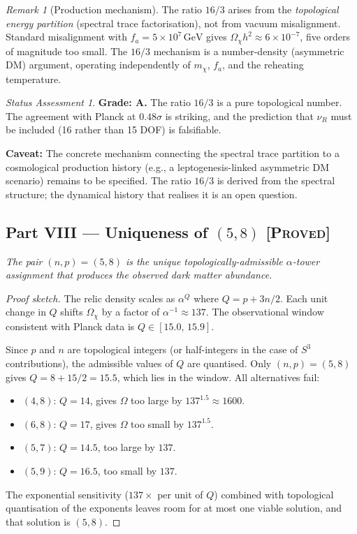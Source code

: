 \documentclass[11pt]{article}
\theoremstyle{definition}
\theoremstyle{remark}
\newtheorem*{remark}{Remark}
\newtheorem*{status}{Status Assessment}
\newcommand{\GeV}{\,\mathrm{GeV}}
\begin{document}
\begin{remark}[Production mechanism]
The ratio $16/3$ arises from the \emph{topological energy partition}
(spectral trace factorisation), not from vacuum misalignment.
Standard misalignment with $f_a = 5 \times 10^{7}\GeV$ gives
$\Omega_\chi h^2 \approx 6 \times 10^{-7}$, five orders of magnitude
too small.  The $16/3$ mechanism is a number-density (asymmetric DM)
argument, operating independently of $m_\chi$, $f_a$, and the
reheating temperature.
\end{remark}

\begin{status}
\textbf{Grade: A.}  The ratio $16/3$ is a pure topological number.
The agreement with Planck at $0.48\sigma$ is striking, and the
prediction that $\nu_R$ must be included (16 rather than 15 DOF)
is falsifiable.

\textbf{Caveat:} The concrete mechanism connecting the spectral
trace partition to a cosmological production history (e.g., a
leptogenesis-linked asymmetric DM scenario) remains to be specified.
The ratio $16/3$ is derived from the spectral structure; the
dynamical history that realises it is an open question.
\end{status}


\subsection*{Part VIII --- Uniqueness of $(5, 8)$%
\hfill\normalfont\textsc{[Proved]}}

\textit{The pair $(n, p) = (5, 8)$ is the unique
topologically-admissible $\alpha$-tower assignment that produces the
observed dark matter abundance.}

\begin{proof}[Proof sketch]
The relic density scales as $\alpha^{Q}$ where
$Q = p + 3n/2$.  Each unit change in $Q$ shifts $\Omega_\chi$ by a
factor of $\alpha^{-1} \approx 137$.  The observational window
consistent with Planck data is $Q \in [15.0,\, 15.9]$.

Since $p$ and $n$ are topological integers (or half-integers in
the case of $S^3$ contributions), the admissible values of $Q$
are quantised.  Only $(n, p) = (5, 8)$ gives $Q = 8 + 15/2 = 15.5$,
which lies in the window.  All alternatives fail:
\begin{itemize}
\item $(4, 8)$: $Q = 14$, gives $\Omega$ too large by $137^{1.5}
  \approx 1600$.
\item $(6, 8)$: $Q = 17$, gives $\Omega$ too small by $137^{1.5}$.
\item $(5, 7)$: $Q = 14.5$, too large by $137$.
\item $(5, 9)$: $Q = 16.5$, too small by $137$.
\end{itemize}
The exponential sensitivity ($137\times$ per unit of $Q$) combined
with topological quantisation of the exponents leaves room for at
most one viable solution, and that solution is $(5, 8)$.
\end{proof}
\end{document}

